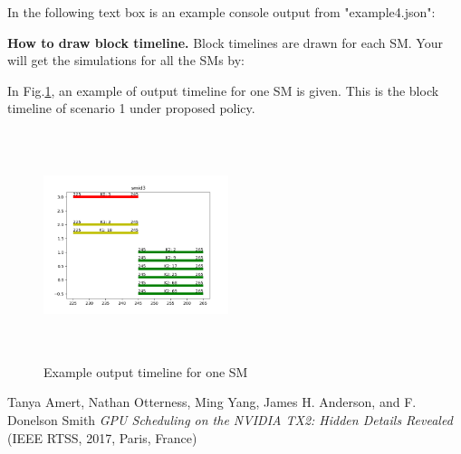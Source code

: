 \documentclass[conference]{IEEEtran}
\begin{document}
In the following text box is an example console output from "example4.json":

\newline

\textbf{How to draw block timeline.} Block timelines are drawn for each SM. Your will get the simulations for all the SMs by:

\newline

In Fig.\ref{fig:example_out}, an example of output timeline for one SM is given. This is the block timeline of scenario 1 under proposed policy.
\begin{figure}[h]
   \centering
   \includegraphics[width=0.48\textwidth, height=190pt]{figs/example1_opt.png}
   \caption{Example output timeline for one SM}
   \label{fig:example_out}
\end{figure}


\begin{thebibliography}{99}
 Tanya Amert, Nathan Otterness, Ming Yang, James H. Anderson, and F. Donelson Smith \emph{GPU Scheduling on the NVIDIA TX2: Hidden Details Revealed} (IEEE RTSS, 2017, Paris, France)
\end{thebibliography}
\end{document}
